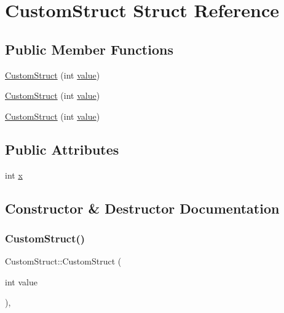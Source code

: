 \hypertarget{struct_custom_struct}{}\section{Custom\+Struct Struct Reference}
\label{struct_custom_struct}
\subsection*{Public Member Functions}
\begin{DoxyCompactItemize}
\item 
\mbox{\hyperlink{struct_custom_struct_aeab194957ba9e056e81c721e83c61941}{Custom\+Struct}} (int \mbox{\hyperlink{_obj__test_2lib_2googletest-master_2googlemock_2test_2gmock-matchers__test_8cc_a337b8a670efc0b086ad3af163f3121b6}{value}})
\item 
\mbox{\hyperlink{struct_custom_struct_aeab194957ba9e056e81c721e83c61941}{Custom\+Struct}} (int \mbox{\hyperlink{_obj__test_2lib_2googletest-master_2googlemock_2test_2gmock-matchers__test_8cc_a337b8a670efc0b086ad3af163f3121b6}{value}})
\item 
\mbox{\hyperlink{struct_custom_struct_aeab194957ba9e056e81c721e83c61941}{Custom\+Struct}} (int \mbox{\hyperlink{_obj__test_2lib_2googletest-master_2googlemock_2test_2gmock-matchers__test_8cc_a337b8a670efc0b086ad3af163f3121b6}{value}})
\end{DoxyCompactItemize}
\subsection*{Public Attributes}
\begin{DoxyCompactItemize}
\item 
int \mbox{\hyperlink{struct_custom_struct_a436b0c2ffdab1f711fa40cfa3e246602}{x}}
\end{DoxyCompactItemize}


\subsection{Constructor \& Destructor Documentation}
\mbox{\label{struct_custom_struct_aeab194957ba9e056e81c721e83c61941}} 
\subsubsection{\texorpdfstring{CustomStruct()}{CustomStruct()}\hspace{0.1cm}{\footnotesize\ttfamily [1/3]}}
{\footnotesize\ttfamily Custom\+Struct\+::\+Custom\+Struct (\begin{DoxyParamCaption}\item[{int}]{value }\end{DoxyParamCaption})\hspace{0.3cm}{\ttfamily [inline]}, {\ttfamily [explicit]}}

